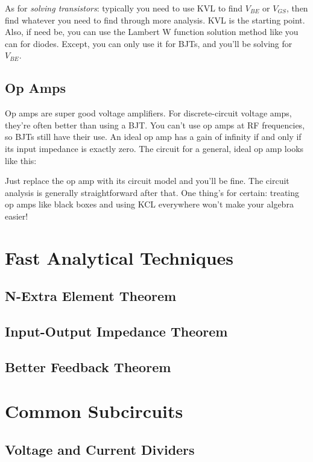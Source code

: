 \documentclass[12pt]{report}
\begin{document}
As for \textit{solving transistors}: typically you need to use KVL to find $V_{BE}$ or $V_{GS}$, then find whatever you need to find through more analysis. KVL is the starting point. Also, if need be, you can use the Lambert W function solution method like you can for diodes. Except, you can only use it for BJTs, and you'll be solving for $V_{BE}$.
\subsection{Op Amps}
Op amps are super good voltage amplifiers. For discrete-circuit voltage amps, they're often better than using a BJT. You can't use op amps at RF frequencies, so BJTs still have their use. An ideal op amp has a gain of infinity if and only if its input impedance is exactly zero.
The circuit for a general, ideal op amp looks like this:

Just replace the op amp with its circuit model and you'll be fine. The circuit analysis is generally straightforward after that. One thing's for certain: treating op amps like black boxes and using KCL everywhere won't make your algebra easier!

\section{Fast Analytical Techniques}
\subsection{N-Extra Element Theorem}
\subsection{Input-Output Impedance Theorem}
\subsection{Better Feedback Theorem}
\section{Common Subcircuits}
\subsection{Voltage and Current Dividers}
\end{document}
